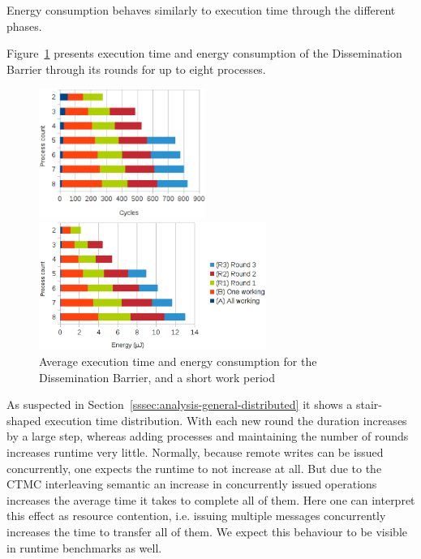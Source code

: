 \documentclass[a4paper, 10pt]{article}
\begin{document}
Energy consumption behaves similarly to execution time through the different phases.

Figure~\ref{fig:d-work-100-partition} presents execution time and energy consumption of the Dissemination Barrier through its rounds for up to eight processes.
\begin{figure}[htbp]
	\centering
	\begin{minipage}{0.43\linewidth}
		\includegraphics[height=4.2cm]{charts/d-time-work-100-partition}
	\end{minipage}
	\begin{minipage}{0.56\linewidth}
		\includegraphics[height=4.2cm]{charts/d-energy-work-100-partition}
	\end{minipage}
	\caption{Average execution time and energy consumption for the Dissemination Barrier, and a short work period}
	\label{fig:d-work-100-partition}
\end{figure}
As suspected in Section~\ref{sssec:analysis-general-distributed} it shows a stair-shaped execution time distribution. With each new round the duration increases by a large step, whereas adding processes and maintaining the number of rounds increases runtime very little.
Normally, because remote writes can be issued concurrently, one expects the runtime to not increase at all. But due to the CTMC interleaving semantic an increase in concurrently issued operations increases the average time it takes to complete all of them.
Here one can interpret this effect as resource contention, i.e. issuing multiple messages concurrently increases the time to transfer all of them. We expect this behaviour to be visible in runtime benchmarks as well.
\end{document}
